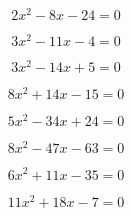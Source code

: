 \documentclass[a4paper]{article}
\begin{document}
\begin{equation}
	2x^2 -8x -24 = 0
\end{equation}

\begin{equation}
	3x^2 -11x -4 = 0
\end{equation}

\begin{equation}
	3x^2 -14x +5 = 0
\end{equation}

\begin{equation}
	8x^2 +14x -15 = 0
\end{equation}

\begin{equation}
	5x^2 -34x +24 = 0
\end{equation}

\begin{equation}
	8x^2 -47x -63 = 0
\end{equation}

\begin{equation}
	6x^2 +11x -35 = 0
\end{equation}

\begin{equation}
	11x^2 +18x -7 = 0
\end{equation}


%
\end{document}
